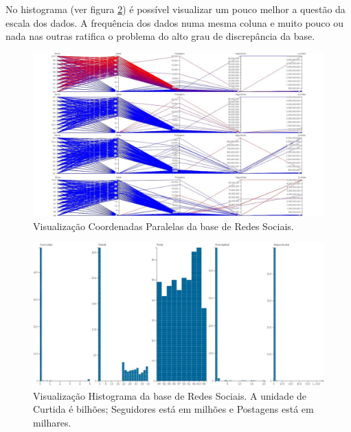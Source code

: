 \documentclass[
	12pt,				%
	openright,			%
	twoside,			%
	a4paper,			%
	english,			%
	brazil				%
	]{abntex2}
\begin{document}
	No histograma (ver figura \ref{fig:HistogramaRS}) é possível visualizar um pouco melhor a questão da escala dos dados.
	A frequência dos dados numa mesma coluna e muito pouco ou nada nas outras ratifica o problema do alto grau de discrepância da base.
	\par

	\begin{figure}[h!]
		\centering
		\includegraphics[width=\linewidth]{./figures/Resultados/PCRS.png}
		\caption{Visualização Coordenadas Paralelas da base de Redes Sociais.}
		\label{fig:PCRS}
	\end{figure}

	\begin{figure}[h!]
		\centering
		\includegraphics[width=\linewidth]{./figures/Resultados/HistogramaRS.jpg}
		\caption{Visualização Histograma da base de Redes Sociais. A unidade de Curtida é bilhões; Seguidores está em milhões e Postagens está em milhares.}
		\label{fig:HistogramaRS}
	\end{figure}

\end{document}
